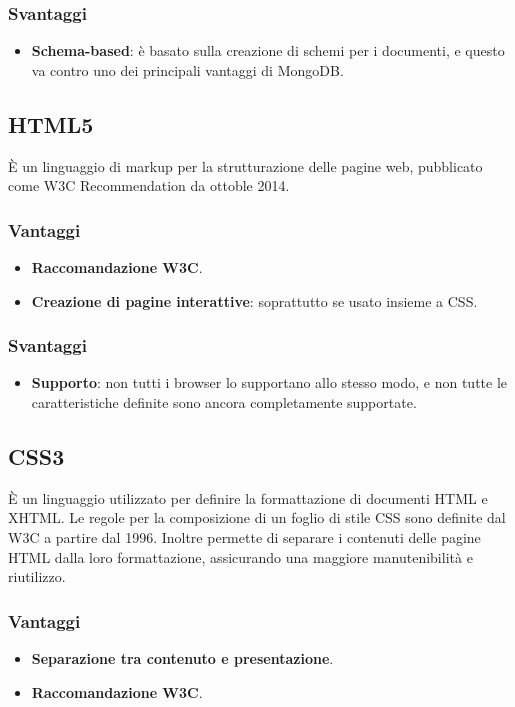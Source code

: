 \subsubsection{Svantaggi}
\begin{itemize}
\item \textbf{Schema-based}: \`e basato sulla creazione di schemi per i documenti, e questo va contro uno dei principali vantaggi di MongoDB.
\end{itemize}
\subsection{HTML5}
\`E un linguaggio di markup per la strutturazione delle pagine web, pubblicato come W3C Recommendation da ottoble 2014.
\subsubsection{Vantaggi}
\begin{itemize}
\item \textbf{Raccomandazione W3C}.
\item \textbf{Creazione di pagine interattive}: soprattutto se usato insieme a CSS.
\end{itemize}
\subsubsection{Svantaggi}
\begin{itemize}
\item \textbf{Supporto}: non tutti i browser lo supportano allo stesso modo, e non tutte le caratteristiche definite sono ancora completamente supportate.
\end{itemize}
\subsection{CSS3}
\`E un linguaggio utilizzato per definire la formattazione di documenti HTML e XHTML. Le regole per la composizione di un foglio di stile CSS sono definite dal W3C a partire dal 1996. Inoltre permette di separare i contenuti delle pagine HTML dalla loro formattazione, assicurando una maggiore manutenibilit\`a e riutilizzo.
\subsubsection{Vantaggi}
\begin{itemize}
\item \textbf{Separazione tra contenuto e presentazione}.
\item \textbf{Raccomandazione W3C}.
\end{itemize}
